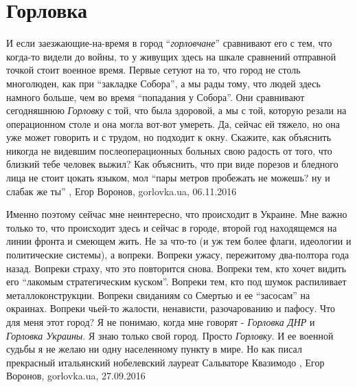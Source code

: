  
 
 
 
 
\chapter{Горловка}

И если заезжающие-на-время в город \enquote{\emph{горловчане}} сравнивают его с тем,
что когда-то видели до войны, то у живущих здесь на шкале сравнений отправной
точкой стоит военное время. Первые сетуют на то, что город не столь многолюден,
как при \enquote{закладке Собора}, а мы рады тому, что людей здесь намного
больше, чем во время \enquote{попадания у Собора}. Они сравнивают сегодняшнюю
\emph{Горловку} с той, что была здоровой, а мы с той, которую резали на
операционном столе и она могла вот-вот умереть. Да, сейчас ей тяжело, но она
уже может говорить и с трудом, но подходит к окну. Скажите, как объяснить
никогда не видевшим послеоперационных больных свою радость от того, что близкий
тебе человек выжил? Как объяснить, что при виде порезов и бледного лица не
стоит цокать языком, мол \enquote{пары метров пробежать не можешь? ну и слабак
же ты}
, 
Егор Воронов, gorlovka.ua, 06.11.2016

Именно поэтому сейчас мне неинтересно, что происходит в Украине. Мне важно
только то, что происходит здесь и сейчас в городе, второй год находящемся на
линии фронта и смеющем жить. Не за что-то (и уж тем более флаги, идеологии и
политические системы), а вопреки. Вопреки ужасу, пережитому два-полтора года
назад. Вопреки страху, что это повторится снова. Вопреки тем, кто хочет видить
его \enquote{лакомым стратегическим куском}. Вопреки тем, кто под шумок распиливает
металлоконструкции. Вопреки свиданиям со Смертью и ее \enquote{засосам} на окраинах.
Вопреки чьей-то жалости, ненависти, разочарованию и пафосу. Что для меня этот
город? Я не понимаю, когда мне говорят - \emph{Горловка ДНР} и \emph{Горловка Украины}. Я
знаю только свой город. Просто \emph{Горловку}. И ее военной судьбы я не желаю ни одну
населенному пункту в мире. Но как писал прекрасный итальянский нобелевский
лауреат Сальваторе Квазимодо
, 
Егор Воронов, gorlovka.ua, 27.09.2016

